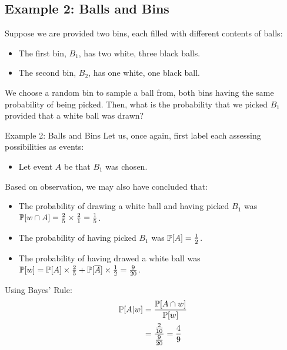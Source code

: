 \subsection{Example 2: Balls and Bins}
Suppose we are provided two bins, each filled with different contents of balls:
\begin{itemize}
    \item The first bin, $B_1$, has two white, three black balls.
    \item The second bin, $B_2$, has one white, one black ball.
\end{itemize}
We choose a random bin to sample a ball from, both bins having the same probability of being picked. Then, what is the probability that we picked $B_1$ provided that a white ball was drawn?
\begin{ln-quest}{Example 2: Balls and Bins}{}
    Let us, once again, first label each assessing possibilities as events:
    \begin{itemize}
        \item Let event $A$ be that $B_1$ was chosen.
    \end{itemize}
    Based on observation, we may also have concluded that:
    \begin{itemize}
        \item The probability of drawing a white ball and having picked $B_1$ was $\P[w \cap A] = \frac{2}{5} \times \frac{2}{1} = \frac{1}{5}$.
        \item The probability of having picked $B_1$ was $\P[A] = \frac{1}{2}$.
        \item The probability of having drawed a white ball was $\P[w] = \P[A] \times \frac{2}{5} + \P[\overline{A}] \times \frac{1}{2} = \frac{9}{20}$.
    \end{itemize}
    Using Bayes' Rule:
    \begin{align*}
        \P[A|w] &= \frac{\P[A \cap w]}{\P[w]} \\
        &= \frac{\frac{2}{10}}{\frac{9}{20}} = \frac{4}{9}
    \end{align*}
\end{ln-quest}

